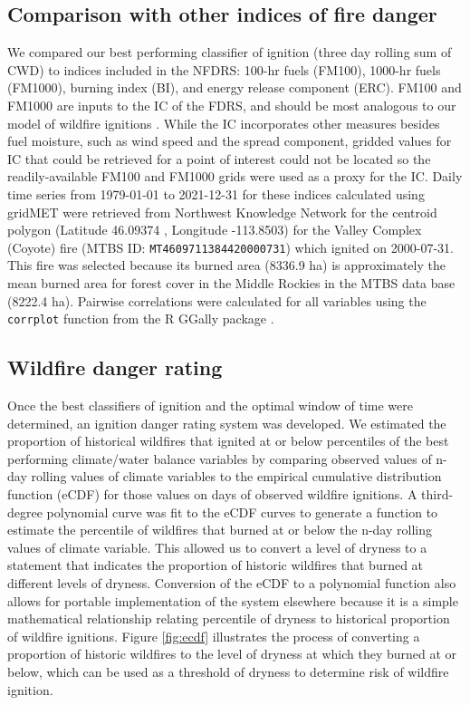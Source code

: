 \documentclass[11p]{article}
\begin{document}
\subsection{Comparison with other indices of fire danger}

We compared our best performing classifier of ignition (three day rolling sum of CWD) to indices included in the NFDRS: 100-hr fuels (FM100), 1000-hr fuels (FM1000), burning index (BI), and energy release component (ERC).  FM100 and FM1000 are inputs to the IC of the FDRS, and should be most analogous to our model of wildfire ignitions \citep{jollyModernizingUSNational2024}. While the IC incorporates other measures besides fuel moisture, such as wind speed and the spread component, gridded values for IC that could be retrieved for a point of interest could not be located so the readily-available FM100 and FM1000 grids were used as a proxy for the IC. Daily time series from 1979-01-01 to 2021-12-31 for these indices calculated using gridMET were retrieved from Northwest Knowledge Network \citep{northwestknowledgenetworREACCHMETDATAGRIDMET2025} for the centroid polygon (Latitude 46.09374 
, Longitude -113.8503) for the Valley Complex (Coyote) fire (MTBS ID: \texttt{MT4609711384420000731}) which ignited on 2000-07-31. This fire was selected because its burned area (8336.9 ha) is approximately the mean burned area for forest cover in the Middle Rockies in the MTBS data base (8222.4 ha). Pairwise correlations were calculated for all variables using the \texttt{corrplot} function from the R GGally package \citep{schloerkeGGallyExtensionGgplot22024}.

\subsection{Wildfire danger rating}

Once the best classifiers of ignition and the optimal window of time were determined, an ignition danger rating system was developed. We estimated the proportion of historical wildfires that ignited at or below percentiles of the best performing climate/water balance variables by comparing observed values of n-day rolling values of climate variables to the empirical cumulative distribution function (eCDF) for those values on days of observed wildfire ignitions. A third-degree polynomial curve was fit to the eCDF curves to generate a function to estimate the percentile of wildfires that burned at or below the n-day rolling values of climate variable. This allowed us to convert a level of dryness to a statement that indicates the proportion of historic wildfires that burned at different levels of dryness. Conversion of the eCDF to a polynomial function also allows for portable implementation of the system elsewhere because it is a simple mathematical relationship relating percentile of dryness to historical proportion of wildfire ignitions. Figure \ref{fig:ecdf} illustrates the process of converting a proportion of historic wildfires to the level of dryness at which they burned at or below, which can be used as a threshold of dryness to determine risk of wildfire ignition.
\end{document}
